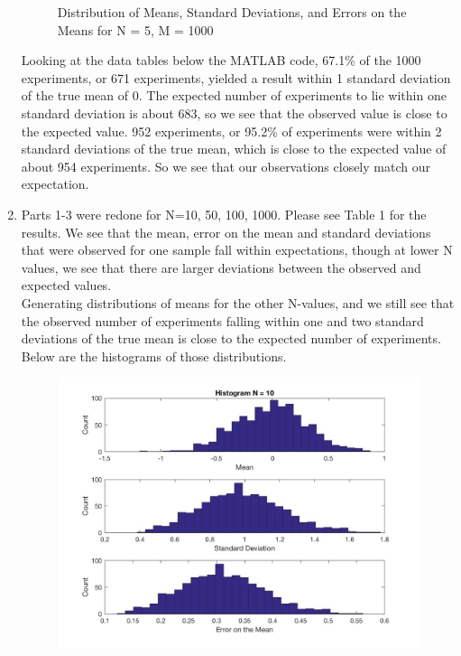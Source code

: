 \documentclass{article}
\begin{document}
\begin{enumerate}
\begin{figure}[H]
    \caption{Distribution of Means, Standard Deviations, and Errors on the Means for N = 5, M = 1000}
    \label{fig:my_label}
\end{figure}
            Looking at the data tables below the MATLAB code, 67.1\% of the 1000 experiments, or 671 experiments, yielded a result within 1 standard deviation of the true mean of 0. The expected number of experiments to lie within one standard deviation is about 683, so we see that the observed value is close to the expected value. 952 experiments, or 95.2\% of experiments were within 2 standard deviations of the true mean, which is close to the expected value of about 954 experiments. So we see that our observations closely match our expectation.
            \item Parts 1-3 were redone for N=10, 50, 100, 1000. Please see Table 1 for the results. We see that the mean, error on the mean and standard deviations that were observed for one sample fall within expectations, though at lower N values, we see that there are larger deviations between the observed and expected values. 
            \\Generating distributions of means for the other N-values, and we still see that the observed number of experiments falling within one and two standard deviations of the true mean is close to the expected number of experiments. Below are the histograms of those distributions.\\
            \begin{figure}[H]
    \centering
    \includegraphics[scale = 0.2]{3b.jpg}

\end{figure}
\end{enumerate}
\end{document}
